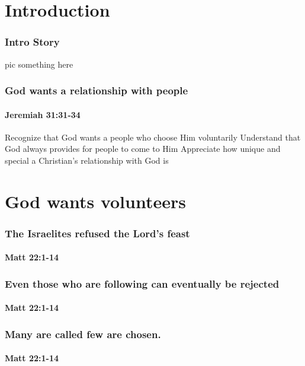 
\section*{Introduction}

\begin{frame}
\frametitle{Intro Story}
	\begin{center}
	pic something here
	\end{center}
\end{frame}

\begin{frame}
\frametitle{God wants a relationship with people}
\framesubtitle{Jeremiah 31:31-34}

\end{frame}

\begin{goals}
\goal Recognize that God wants a people who choose Him voluntarily
\goal Understand that God always provides for people to come to Him
\goal Appreciate how unique and special a Christian's relationship with God is

\end{goals}

\section{God wants volunteers}

\begin{frame}
\frametitle{The Israelites refused the Lord's feast}
\framesubtitle{Matt 22:1-14}

\end{frame}

\begin{frame}
\frametitle{Even those who are following can eventually be rejected}
\framesubtitle{Matt 22:1-14}

\end{frame}

\begin{frame}
\frametitle{Many are called few are chosen.}
\framesubtitle{Matt 22:1-14}

\end{frame}

